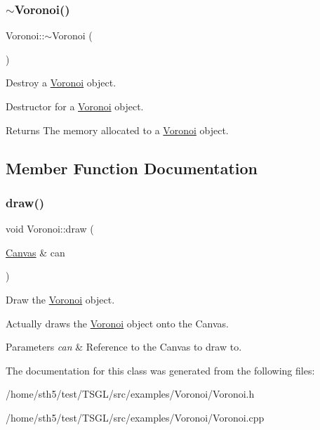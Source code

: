\subsubsection{\texorpdfstring{$\sim$\+Voronoi()}{~Voronoi()}}
{\footnotesize\ttfamily Voronoi\+::$\sim$\+Voronoi (\begin{DoxyParamCaption}{ }\end{DoxyParamCaption})\hspace{0.3cm}{\ttfamily [virtual]}}



Destroy a \hyperlink{class_voronoi}{Voronoi} object. 

Destructor for a \hyperlink{class_voronoi}{Voronoi} object. \begin{DoxyReturn}{Returns}
The memory allocated to a \hyperlink{class_voronoi}{Voronoi} object. 
\end{DoxyReturn}


\subsection{Member Function Documentation}
\mbox{\label{class_voronoi_a8455f7017a285ff1859829202970f071}} 
\subsubsection{\texorpdfstring{draw()}{draw()}}
{\footnotesize\ttfamily void Voronoi\+::draw (\begin{DoxyParamCaption}\item[{\hyperlink{classtsgl_1_1_canvas}{Canvas} \&}]{can }\end{DoxyParamCaption})}



Draw the \hyperlink{class_voronoi}{Voronoi} object. 

Actually draws the \hyperlink{class_voronoi}{Voronoi} object onto the Canvas. 
\begin{DoxyParams}{Parameters}
{\em can} & Reference to the Canvas to draw to. \\
\hline
\end{DoxyParams}


The documentation for this class was generated from the following files\+:\begin{DoxyCompactItemize}
\item 
/home/sth5/test/\+T\+S\+G\+L/src/examples/\+Voronoi/Voronoi.\+h\item 
/home/sth5/test/\+T\+S\+G\+L/src/examples/\+Voronoi/Voronoi.\+cpp\end{DoxyCompactItemize}

